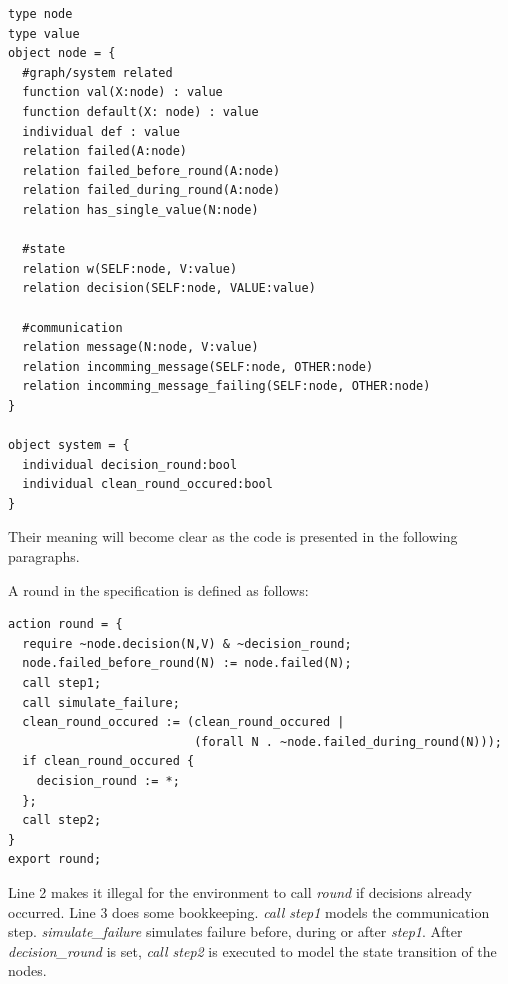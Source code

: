 \documentclass[fleqn]{article}
\begin{document}
\begin{mdframed}[backgroundcolor=light-gray, roundcorner=10pt,leftmargin=1, rightmargin=1, innerleftmargin=15, innertopmargin=15,innerbottommargin=15, outerlinewidth=1, linecolor=light-gray]
\begin{lstlisting}
type node
type value
object node = {
  #graph/system related
  function val(X:node) : value
  function default(X: node) : value
  individual def : value
  relation failed(A:node)
  relation failed_before_round(A:node)
  relation failed_during_round(A:node)
  relation has_single_value(N:node)

  #state
  relation w(SELF:node, V:value)
  relation decision(SELF:node, VALUE:value)

  #communication
  relation message(N:node, V:value)
  relation incomming_message(SELF:node, OTHER:node)
  relation incomming_message_failing(SELF:node, OTHER:node)
}

object system = {
  individual decision_round:bool
  individual clean_round_occured:bool
}
\end{lstlisting}
\end{mdframed}

\noindent Their meaning will become clear as the code is presented in the following paragraphs.


\noindent A round in the specification is defined as follows:
\begin{mdframed}[backgroundcolor=light-gray, roundcorner=10pt,leftmargin=1, rightmargin=1, innerleftmargin=15, innertopmargin=15,innerbottommargin=15, outerlinewidth=1, linecolor=light-gray]
\begin{lstlisting}
action round = {
  require ~node.decision(N,V) & ~decision_round;
  node.failed_before_round(N) := node.failed(N);
  call step1;
  call simulate_failure;
  clean_round_occured := (clean_round_occured |
                          (forall N . ~node.failed_during_round(N)));
  if clean_round_occured {
    decision_round := *;
  };
  call step2;
}
export round;
\end{lstlisting}
\end{mdframed}

\noindent Line 2 makes it illegal for the environment to call \textit{round} if decisions already occurred.
\noindent Line 3 does some bookkeeping.
\textit{call step1} models the communication step. \textit{simulate\_failure} simulates failure before, during
or after \textit{step1}. After \textit{decision\_round} is set, \textit{call step2} is
executed to model the state transition of the nodes.
\end{document}
